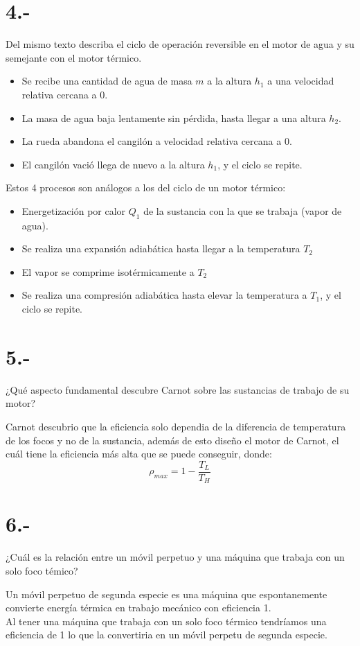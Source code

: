 \documentclass{article}
\begin{document}
\section*{4.-}
Del mismo texto describa el ciclo de operación reversible en el motor de agua y su semejante con el motor térmico.
\begin{tcolorbox}[breakable]
    \begin{itemize}
        \item Se recibe una cantidad de agua de masa $m$ a la altura $h_1$ a una velocidad relativa cercana a $0$.
        \item La masa de agua baja lentamente sin pérdida, hasta llegar a una altura $h_2$.
        \item La rueda abandona el cangilón a velocidad relativa cercana a $0$.
        \item El cangilón vació llega de nuevo a la altura $h_1$, y el ciclo se repite.
    \end{itemize}
    Estos 4 procesos son análogos a los del ciclo de un motor térmico:
    \begin{itemize}
        \item Energetización por calor $Q_1$ de la sustancia con la que se trabaja (vapor de agua).
        \item Se realiza una expansión adiabática hasta llegar a la temperatura $T_2$
        \item El vapor se comprime isotérmicamente a $T_2$ 
        \item Se realiza una compresión adiabática hasta elevar la temperatura a $T_1$, y el ciclo se repite.   
    \end{itemize}
\end{tcolorbox}

\section*{5.-}
¿Qué aspecto fundamental descubre Carnot sobre las sustancias de trabajo de su motor?
\begin{tcolorbox}[breakable]
    Carnot descubrio que la eficiencia solo dependia de la diferencia de temperatura de los focos y no de la sustancia, 
    además de esto diseño el motor de Carnot, el cuál tiene la eficiencia más alta que se puede conseguir, donde:
    \[ \rho_{max} = 1 - \frac{T_L}{T_H} \]
\end{tcolorbox}

\section*{6.-}
¿Cuál es la relación entre un móvil perpetuo y una máquina que trabaja con un solo foco témico?
\begin{tcolorbox}[breakable]
    Un móvil perpetuo de segunda especie es una máquina que espontanemente convierte energía térmica en trabajo mecánico con eficiencia 1. \\
    Al tener una máquina que trabaja con un solo foco térmico tendríamos una eficiencia de 1 lo que la convertiria en un móvil perpetu de segunda especie.
\end{tcolorbox}
\end{document}
